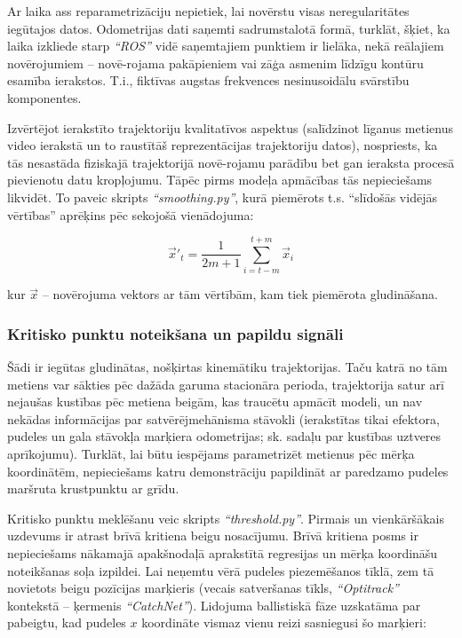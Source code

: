 \documentclass[12pt, a4paper]{article}
\numberwithin{equation}{section} %
\begin{document}
Ar laika ass reparametrizāciju nepietiek, lai novērstu visas neregularitātes iegūtajos datos. Odometrijas dati saņemti sadrumstalotā formā, turklāt, šķiet, ka laika izkliede starp \textit{``ROS''} vidē saņemtajiem punktiem ir lielāka, nekā reālajiem novērojumiem -- novē-rojama pakāpieniem vai zāģa asmenim līdzīgu kontūru esamība ierakstos. T.i., fiktīvas augstas frekvences nesinusoidālu svārstību komponentes. 

Izvērtējot ierakstīto trajektoriju kvalitatīvos aspektus (salīdzinot līganus metienus video ierakstā un to raustītāš reprezentācijas trajektoriju datos), nospriests, ka tās nesastāda fiziskajā trajektorijā novē-rojamu parādību bet gan ieraksta procesā pievienotu datu kropļojumu. Tāpēc pirms modeļa apmācības tās nepieciešams likvidēt. To paveic skripts \textit{``smoothing.py''}, kurā piemērots t.s. ``slīdošās vidējās vērtības'' aprēķins pēc sekojošā vienādojuma:


\begin{equation}
    \vec{x}'_{t} = \frac{1}{2m+1} \sum_{i=t-m}^{t+m} \vec{x}_i
\end{equation}

kur $\vec{x}$ -- novērojuma vektors ar tām vērtībām, kam tiek piemērota gludināšana.

\subsubsection{Kritisko punktu noteikšana un papildu signāli}

Šādi ir iegūtas gludinātas, nošķirtas kinemātiku trajektorijas. Taču katrā no tām metiens var sākties pēc dažāda garuma stacionāra perioda, trajektorija satur arī nejaušas kustības pēc metiena beigām, kas traucētu apmācīt modeli, un nav nekādas informācijas par satvērējmehānisma stāvokli (ierakstītas tikai efektora, pudeles un gala stāvokļa marķiera odometrijas; sk. sadaļu par kustības uztveres aprīkojumu). Turklāt, lai būtu iespējams parametrizēt metienus pēc mērķa koordinātēm, nepieciešams katru demonstrāciju papildināt ar paredzamo pudeles maršruta krustpunktu ar grīdu. 

Kritisko punktu meklēšanu veic skripts \textit{``threshold.py''}. Pirmais un vienkāršākais uzdevums ir atrast brīvā kritiena beigu nosacījumu. Brīvā kritiena posms ir nepieciešams nākamajā apakšnodaļā aprakstītā regresijas un mērķa koordināšu noteikšanas soļa izpildei. Lai neņemtu vērā pudeles piezemēšanos tīklā, zem tā novietots beigu pozīcijas marķieris (vecais satveršanas tīkls, \textit{``Optitrack''} kontekstā -- ķermenis \textit{``CatchNet''}). Lidojuma ballistiskā fāze uzskatāma par pabeigtu, kad pudeles $x$ koordināte vismaz vienu reizi sasniegusi šo marķieri:
\end{document}
